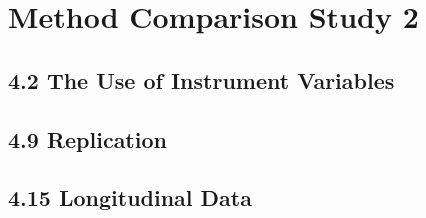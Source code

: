 \section*{Method Comparison Study 2}

\subsection*{4.2 The Use of Instrument Variables}

\subsection*{4.9 Replication}

\subsection*{4.15 Longitudinal Data}
